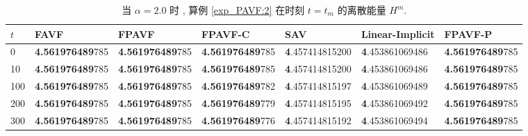 	
\begin{table}[H]\footnotesize
	\centering
	\caption{当 $\alpha=2.0$ 时 , 算例 \ref{exp_PAVF:2}  在时刻 $t=t_{m}$ 的离散能量 $H^{m}$.}

	  \begin{tabular}{lllllll}
	  \toprule
       $t$   &FAVF   &FPAVF   &FPAVF-C   &SAV    &Linear-Implicit   &FPAVF-P\\
	\midrule
	0     &\textbf{4.561976489}785   &\textbf{4.561976489}785   &\textbf{4.561976489}785   &\textbf{4}.457414815200   &\textbf{4}.453861069486   &\textbf{4.561976489}785 \\
	10    &\textbf{4.561976489}785   &\textbf{4.561976489}785   &\textbf{4.561976489}785   &\textbf{4}.457414815200   &\textbf{4}.453861069486   &\textbf{4.561976489}785 \\
	100   &\textbf{4.561976489}785   &\textbf{4.561976489}785   &\textbf{4.561976489}782   &\textbf{4}.457414815197   &\textbf{4}.453861069489   &\textbf{4.561976489}785 \\
	200   &\textbf{4.561976489}785   &\textbf{4.561976489}785   &\textbf{4.561976489}779   &\textbf{4}.457414815195   &\textbf{4}.453861069492   &\textbf{4.561976489}785 \\
	300   &\textbf{4.561976489}785   &\textbf{4.561976489}785   &\textbf{4.561976489}776   &\textbf{4}.457414815192   &\textbf{4}.453861069494   &\textbf{4.561976489}785 \\

\end{tabular}
\end{table}
